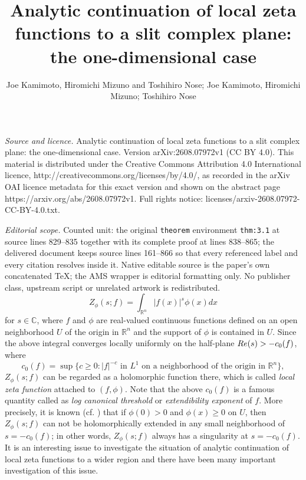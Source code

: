 \documentclass[10pt,a4paper]{amsart}
\numberwithin{equation}{section}
\newcommand{\R}{{\mathbb R}}
\newcommand{\C}{{\mathbb C}}
\newcommand{\1}{{\bf 1}}
\begin{document}
\title[Analytic continuation of local zeta functions to a slit comp]{Analytic continuation of local zeta functions to a slit complex plane: the one-dimensional case}
\author{Joe Kamimoto, Hiromichi Mizuno and Toshihiro Nose; Joe Kamimoto, Hiromichi Mizuno; Toshihiro Nose}
\date{}
\maketitle
\noindent\emph{Source and licence.} Analytic continuation of local zeta functions to a slit complex plane: the one-dimensional case. Version arXiv:2608.07972v1 (CC BY 4.0). This material is distributed under the Creative Commons Attribution 4.0 International licence, http://creativecommons.org/licenses/by/4.0/, as recorded in the arXiv OAI licence metadata for this exact version and shown on the abstract page https://arxiv.org/abs/2608.07972v1. Full rights notice: licenses/arxiv-2608.07972-CC-BY-4.0.txt.\par\smallskip
\noindent\textit{Editorial scope.} Counted unit: the original \texttt{theorem} environment \texttt{thm:3.1} at source lines 829--835 together with its complete proof at lines 838--865; the delivered document keeps source lines 161--866 so that every referenced label and every citation resolves inside it. Native editable source is the paper's own concatenated TeX; the AMS wrapper is editorial formatting only. No publisher class, upstream script or unrelated artwork is redistributed.
\begin{equation}\label{eqn:1.1}
Z_{\phi}(s;f)=\int_{\R^n} 
|f(x)|^s \phi(x) dx
\end{equation}
for $s\in\C$, 
where $f$ and $\phi$ are 
real-valued continuous functions defined 
on an open neighborhood $U$ of the origin in 
$\R^n$ and 
the support of $\phi$ is contained 
in $U$. 
Since the above integral 
converges locally uniformly on the half-plane
${\rm Re}(s)>-c_0(f)$, where
\begin{equation}
c_0(f)=\sup\{
c\geq 0:|f|^{-c}
\mbox{ in $L^1$ on a neighborhood 
of the origin in } \R^n\},
\end{equation}
$Z_{\phi}(s;f)$ can be regarded 
as a holomorphic function there, 
which is called 
{\it local zeta function} attached to $(f,\phi)$. 
Note that the above $c_0(f)$ 
is a famous quantity called as
{\it log canonical threshold}
or 
{\it extendibility exponent} of $f$. 
More precisely, 
it is known (cf. \cite{KaN19}) that
if $\phi(0)>0$ and $\phi(x)\geq 0$ on $U$, 
then $Z_{\phi}(s;f)$ 
can not be holomorphically 
extended in any small neighborhood 
of $s=-c_0(f)$; in other words, 
$Z_{\phi}(s;f)$
always has a singularity at 
$s=-c_0(f)$. 
It is an interesting issue to investigate
the situation of analytic continuation of 
local zeta functions 
to a wider region and 
there have been many important 
investigation of this issue.
\end{document}
